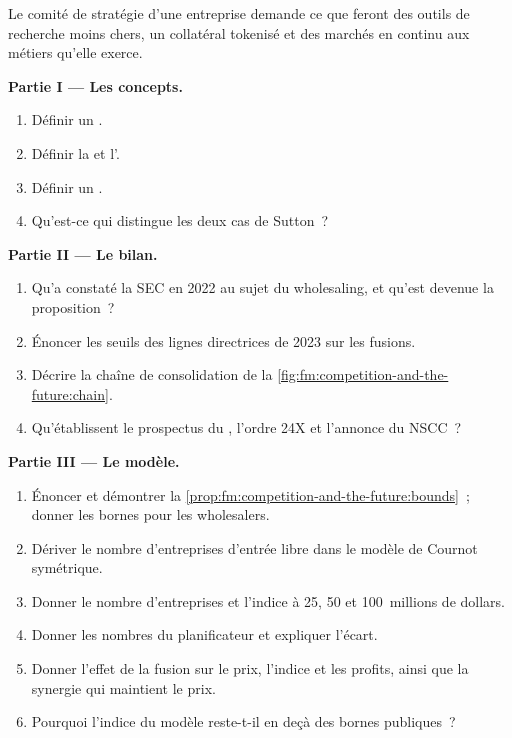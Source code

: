 \begin{problem}\label{pb:fm:competition-and-the-future:1}
Le comité de stratégie d'une entreprise demande ce que feront des outils de recherche moins chers, un collatéral tokenisé et des marchés en continu aux métiers qu'elle exerce.

\medskip\noindent\textbf{Partie I --- Les concepts.}
\begin{enumerate}
\item Définir un .
\item Définir la  et l'.
\item Définir un .
\item Qu'est-ce qui distingue les deux cas de Sutton~?
\end{enumerate}

\medskip\noindent\textbf{Partie II --- Le bilan.}
\begin{enumerate}[resume]
\item Qu'a constaté la SEC en 2022 au sujet du wholesaling, et qu'est devenue la proposition~?
\item Énoncer les seuils des lignes directrices de 2023 sur les fusions.
\item Décrire la chaîne de consolidation de la \cref{fig:fm:competition-and-the-future:chain}.
\item Qu'établissent le prospectus du , l'ordre 24X et l'annonce du NSCC~?
\end{enumerate}

\medskip\noindent\textbf{Partie III --- Le modèle.}
\begin{enumerate}[resume]
\item Énoncer et démontrer la \cref{prop:fm:competition-and-the-future:bounds}~; donner les bornes pour les wholesalers.
\item Dériver le nombre d'entreprises d'entrée libre dans le modèle de Cournot symétrique.
\item Donner le nombre d'entreprises et l'indice à 25, 50 et 100~millions de dollars.
\item Donner les nombres du planificateur et expliquer l'écart.
\item Donner l'effet de la fusion sur le prix, l'indice et les profits, ainsi que la synergie qui maintient le prix.
\item Pourquoi l'indice du modèle reste-t-il en deçà des bornes publiques~?
\end{enumerate}


\end{problem}
